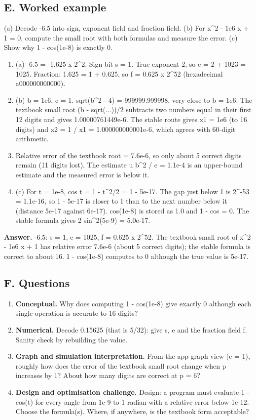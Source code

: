 \documentclass[11pt,a4paper]{article}
\begin{document}
\subsection*{E. Worked example}
(a) Decode -6.5 into sign, exponent field and fraction field. (b) For x\textasciicircum{}2 - 1e6 x + 1 = 0, compute the small root with both formulas and measure the error. (c) Show why 1 - cos(1e-8) is exactly 0.
\begin{enumerate}[nosep]
\item (a) -6.5 = -1.625 x 2\textasciicircum{}2. Sign bit s = 1. True exponent 2, so e = 2 + 1023 = 1025. Fraction: 1.625 = 1 + 0.625, so f = 0.625 x 2\textasciicircum{}52 (hexadecimal a000000000000).
\item (b) b = 1e6, c = 1. sqrt(b\textasciicircum{}2 - 4) = 999999.999998, very close to b = 1e6. The textbook small root (b - sqrt(...))/2 subtracts two numbers equal in their first 12 digits and gives 1.00000761449e-6. The stable route gives x1 = 1e6 (to 16 digits) and x2 = 1 / x1 = 1.000000000001e-6, which agrees with 60-digit arithmetic.
\item Relative error of the textbook root = 7.6e-6, so only about 5 correct digits remain (11 digits lost). The estimate u b\textasciicircum{}2 / c = 1.1e-4 is an upper-bound estimate and the measured error is below it.
\item (c) For t = 1e-8, cos t = 1 - t\textasciicircum{}2/2 = 1 - 5e-17. The gap just below 1 is 2\textasciicircum{}-53 = 1.1e-16, so 1 - 5e-17 is closer to 1 than to the next number below it (distance 5e-17 against 6e-17). cos(1e-8) is stored as 1.0 and 1 - cos = 0. The stable formula gives 2 sin\textasciicircum{}2(5e-9) = 5.0e-17.
\end{enumerate}
\textbf{Answer.} -6.5: s = 1, e = 1025, f = 0.625 x 2\textasciicircum{}52. The textbook small root of x\textasciicircum{}2 - 1e6 x + 1 has relative error 7.6e-6 (about 5 correct digits); the stable formula is correct to about 16. 1 - cos(1e-8) computes to 0 although the true value is 5e-17.

\subsection*{F. Questions}
\begin{enumerate}[nosep]
\item \textbf{Conceptual.} Why does computing 1 - cos(1e-8) give exactly 0 although each single operation is accurate to 16 digits?
\item \textbf{Numerical.} Decode 0.15625 (that is 5/32): give s, e and the fraction field f. Sanity check by rebuilding the value.
\item \textbf{Graph and simulation interpretation.} From the app graph view (c = 1), roughly how does the error of the textbook small root change when p increases by 1? About how many digits are correct at p = 6?
\item \textbf{Design and optimisation challenge.} Design: a program must evaluate 1 - cos(t) for every angle from 1e-9 to 1 radian with a relative error below 1e-12. Choose the formula(s). Where, if anywhere, is the textbook form acceptable?
\end{enumerate}
\end{document}
